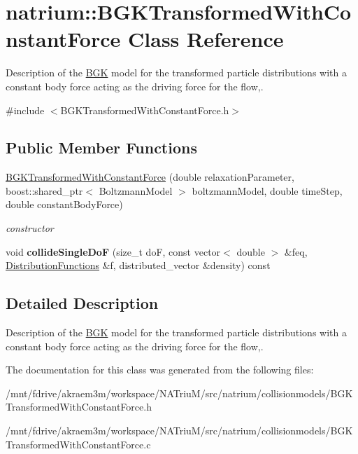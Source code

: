 \hypertarget{classnatrium_1_1BGKTransformedWithConstantForce}{
\section{natrium::BGKTransformedWithConstantForce Class Reference}
\label{classnatrium_1_1BGKTransformedWithConstantForce}
}


Description of the \hyperlink{classnatrium_1_1BGK}{BGK} model for the transformed particle distributions with a constant body force acting as the driving force for the flow,.  


{\ttfamily \#include $<$BGKTransformedWithConstantForce.h$>$}\subsection*{Public Member Functions}
\begin{DoxyCompactItemize}
\item 
\hypertarget{classnatrium_1_1BGKTransformedWithConstantForce_a7fdf7faa57ca3d49cefab0ccec311611}{
\hyperlink{classnatrium_1_1BGKTransformedWithConstantForce_a7fdf7faa57ca3d49cefab0ccec311611}{BGKTransformedWithConstantForce} (double relaxationParameter, boost::shared\_\-ptr$<$ BoltzmannModel $>$ boltzmannModel, double timeStep, double constantBodyForce)}
\label{classnatrium_1_1BGKTransformedWithConstantForce_a7fdf7faa57ca3d49cefab0ccec311611}

\begin{DoxyCompactList}\small\item\em constructor \item\end{DoxyCompactList}\item 
\hypertarget{classnatrium_1_1BGKTransformedWithConstantForce_a14dc4418462149d6bfdb4508786849db}{
void {\bfseries collideSingleDoF} (size\_\-t doF, const vector$<$ double $>$ \&feq, \hyperlink{classnatrium_1_1DistributionFunctions}{DistributionFunctions} \&f, distributed\_\-vector \&density) const }
\label{classnatrium_1_1BGKTransformedWithConstantForce_a14dc4418462149d6bfdb4508786849db}

\end{DoxyCompactItemize}


\subsection{Detailed Description}
Description of the \hyperlink{classnatrium_1_1BGK}{BGK} model for the transformed particle distributions with a constant body force acting as the driving force for the flow,. 

The documentation for this class was generated from the following files:\begin{DoxyCompactItemize}
\item 
/mnt/fdrive/akraem3m/workspace/NATriuM/src/natrium/collisionmodels/BGKTransformedWithConstantForce.h\item 
/mnt/fdrive/akraem3m/workspace/NATriuM/src/natrium/collisionmodels/BGKTransformedWithConstantForce.c\end{DoxyCompactItemize}
